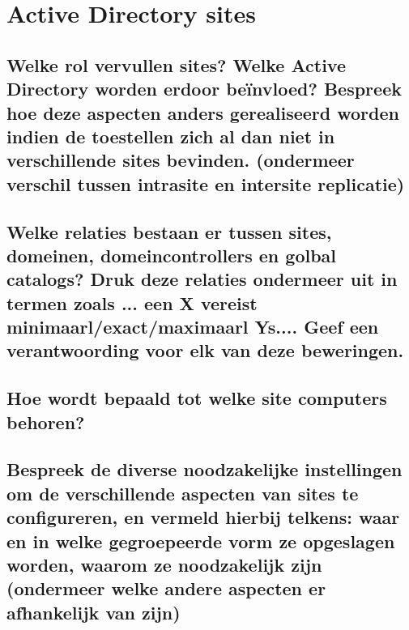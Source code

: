 \chapter{Active Directory sites}

\section{Welke rol vervullen sites? Welke Active Directory worden erdoor
beïnvloed? Bespreek hoe deze aspecten anders gerealiseerd worden indien de
toestellen zich al dan niet in verschillende sites bevinden. (ondermeer verschil
tussen intrasite en intersite replicatie)}

\section{Welke relaties bestaan er tussen sites, domeinen, domeincontrollers en
golbal catalogs? Druk deze relaties ondermeer uit in termen zoals ... een X
vereist minimaarl/exact/maximaarl Ys.... Geef een verantwoording voor elk van
deze beweringen.}

\section{Hoe wordt bepaald tot welke site computers behoren?}

\section{Bespreek de diverse noodzakelijke instellingen om de verschillende
aspecten van sites te configureren, en vermeld hierbij telkens: waar en in welke
gegroepeerde vorm ze opgeslagen worden, waarom ze noodzakelijk zijn (ondermeer
welke andere aspecten er afhankelijk van zijn)}
